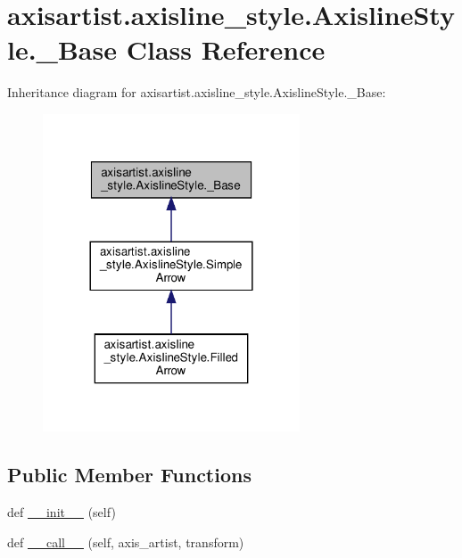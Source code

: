 \hypertarget{classaxisartist_1_1axisline__style_1_1AxislineStyle_1_1__Base}{}\section{axisartist.\+axisline\+\_\+style.\+Axisline\+Style.\+\_\+\+Base Class Reference}
\label{classaxisartist_1_1axisline__style_1_1AxislineStyle_1_1__Base}


Inheritance diagram for axisartist.\+axisline\+\_\+style.\+Axisline\+Style.\+\_\+\+Base\+:
\nopagebreak
\begin{figure}[H]
\begin{center}
\leavevmode
\includegraphics[width=216pt]{classaxisartist_1_1axisline__style_1_1AxislineStyle_1_1__Base__inherit__graph}
\end{center}
\end{figure}
\subsection*{Public Member Functions}
\begin{DoxyCompactItemize}
\item 
def \hyperlink{classaxisartist_1_1axisline__style_1_1AxislineStyle_1_1__Base_a2697a8c9d39cbd71afe4764697a4598d}{\+\_\+\+\_\+init\+\_\+\+\_\+} (self)
\item 
def \hyperlink{classaxisartist_1_1axisline__style_1_1AxislineStyle_1_1__Base_a8951ec05e5a9e96298dab3d7623a5af5}{\+\_\+\+\_\+call\+\_\+\+\_\+} (self, axis\+\_\+artist, transform)
\end{DoxyCompactItemize}


